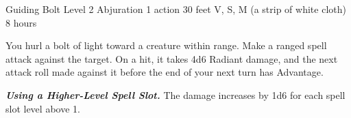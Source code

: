 \DndSpellHeader%
    {Guiding Bolt}
    {Level 2 Abjuration}
    {1 action}
    {30 feet}
    {V, S, M (a strip of white cloth)}
    {8 hours}

You hurl a bolt of light toward a creature within range. Make a ranged spell attack against the target. On a hit, it takes 4d6 Radiant damage, and the next attack roll made against it before the end of your next turn has Advantage.

\textbf{\textit{Using a Higher-Level Spell Slot.}} The damage increases by 1d6 for each spell slot level above 1.
